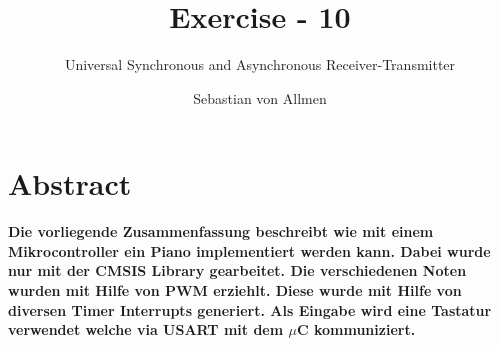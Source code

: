 \documentclass[
   10.5pt,
   invert-title=true,
   titlepage=false,
   titleimage-ratio=13,
   class=article
]{bfhpub}				%
\begin{document}
\setlength{\parskip}{0pt}
\setlength{\parindent}{0pt}
  \title{Exercise - 10}
  \subtitle{Universal Synchronous and Asynchronous Receiver-Transmitter}
  \author{Sebastian von Allmen}
  \subject{BTF3232}
  
  \maketitle

\section*{Abstract}
\textbf{Die vorliegende Zusammenfassung beschreibt wie mit einem Mikrocontroller ein Piano implementiert werden kann. Dabei wurde nur mit der CMSIS Library gearbeitet. Die verschiedenen Noten wurden mit Hilfe von PWM erziehlt. Diese wurde mit Hilfe von diversen Timer Interrupts generiert. Als Eingabe wird eine Tastatur verwendet welche via USART mit dem $\mu$C kommuniziert.}
\end{document}
